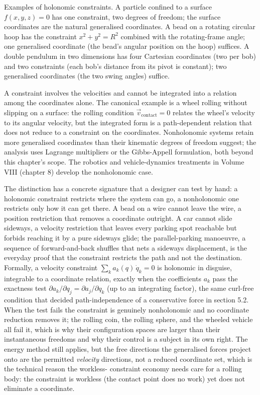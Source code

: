 Examples of holonomic constraints. A particle confined to a surface
$f(x, y, z) = 0$ has one constraint, two degrees of freedom; the
surface coordinates are the natural generalised coordinates. A bead
on a rotating circular hoop has the constraint $x^2 + y^2 = R^2$
combined with the rotating-frame angle; one generalised coordinate
(the bead's angular position on the hoop) suffices. A double pendulum
in two dimensions has four Cartesian coordinates (two per bob) and
two constraints (each bob's distance from its pivot is constant);
two generalised coordinates (the two swing angles) suffice.

A  constraint involves the velocities and
cannot be integrated into a relation among the coordinates alone. The
canonical example is a wheel rolling without slipping on a surface:
the rolling condition $\vec{v}_{\text{contact}} = 0$ relates the
wheel's velocity to its angular velocity, but the integrated form is
a path-dependent relation that does not reduce to a constraint on the
coordinates. Nonholonomic systems retain more generalised
coordinates than their kinematic degrees of freedom suggest; the
analysis uses Lagrange multipliers or the Gibbs-Appell formulation,
both beyond this chapter's scope. The robotics and vehicle-dynamics
treatments in Volume VIII (chapter 8) develop the nonholonomic case.

The distinction has a concrete signature that a designer can test by hand: a
holonomic constraint restricts where the system can go, a nonholonomic one
restricts only how it can get there. A bead on a wire cannot leave the wire,
a position restriction that removes a coordinate outright. A car cannot slide
sideways, a velocity restriction that leaves every parking spot reachable but
forbids reaching it by a pure sideways glide; the parallel-parking manoeuvre,
a sequence of forward-and-back shuffles that nets a sideways displacement, is
the everyday proof that the constraint restricts the path and not the
destination. Formally, a velocity constraint $\sum_k a_k(q)\,\dot q_k = 0$ is
holonomic in disguise, integrable to a coordinate relation, exactly when the
coefficients $a_k$ pass the exactness test $\partial a_k/\partial q_j =
\partial a_j/\partial q_k$ (up to an integrating factor), the same
curl-free condition that decided path-independence of a conservative force in
section 5.2. When the test fails the constraint is genuinely nonholonomic and
no coordinate reduction removes it; the rolling coin, the rolling sphere, and
the wheeled vehicle all fail it, which is why their configuration spaces are
larger than their instantaneous freedoms and why their control is a subject in
its own right. The energy method still applies, but the free directions the
generalised forces project onto are the permitted \emph{velocity} directions,
not a reduced coordinate set, which is the technical reason the workless-
constraint economy needs care for a rolling body: the constraint is workless
(the contact point does no work) yet does not eliminate a coordinate.

